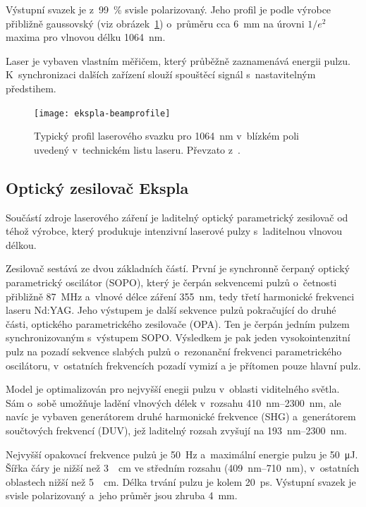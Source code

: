 Výstupní svazek je z~\SI{99}{\percent} svisle polarizovaný.
Jeho profil je podle výrobce přibližně gaussovský
(viz obrázek~\ref{fig:instruments-beamprofile})
o~průměru cca \SI{6}{\milli\metre} na úrovni $1/e^2$ maxima
pro vlnovou délku \SI{1064}{\nano\metre}.
\autocite{ekspla-datasheet}

Laser je vybaven vlastním měřičem, který průběžně zaznamenává energii pulzu.
K~synchronizaci dalších zařízení slouží spouštěcí signál s~nastavitelným
předstihem.\autocite{ekspla-datasheet}

\begin{figure}[htp]
	\centering
	\texttt{[image: ekspla-beamprofile]}
	\caption{Typický profil laserového svazku pro \SI{1064}{\nano\metre}
		v~blízkém poli uvedený v~technickém listu laseru.
		Převzato z~\cite{ekspla-datasheet}.}
	\label{fig:instruments-beamprofile}
\end{figure}

\subsection{Optický zesilovač Ekspla }
\label{sec:instruments-laser-source}
Součástí zdroje laserového záření je laditelný optický parametrický
zesilovač  od téhož výrobce,
který produkuje intenzivní laserové pulzy s~laditelnou vlnovou délkou.

Zesilovač sestává ze dvou základních částí.
První je synchronně čerpaný optický parametrický oscilátor (SOPO),
který je čerpán sekvencemi pulzů o~četnosti přibližně \SI{87}{\mega\hertz}
a~vlnové délce záření \SI{355}{\nano\metre},
tedy třetí harmonické frekvenci laseru Nd:YAG.
Jeho výstupem je další sekvence pulzů pokračující do druhé části,
optického parametrického zesilovače (OPA).
Ten je čerpán jedním pulzem synchronizovaným s~výstupem SOPO.
Výsledkem je pak jeden vysokointenzitní pulz na pozadí sekvence slabých
pulzů o~rezonanční frekvenci parametrického oscilátoru,
v~ostatních frekvencích pozadí vymizí a je přítomen pouze hlavní pulz.
\autocite{ekspla-amp-datasheet}

Model  je optimalizován pro nejvyšší enegii pulzu
v~oblasti viditelného světla.
Sám o~sobě umožňuje ladění vlnových délek v~rozsahu
\SIrange{410}{2300}{\nano\metre},
ale navíc je vybaven generátorem druhé harmonické frekvence (SHG)
a~generátorem součtových frekvencí (DUV),
jež laditelný rozsah zvyšují na \SIrange{193}{2300}{\nano\metre}.

Nejvyšší opakovací frekvence pulzů je \SI{50}{\hertz}
a~maximální energie pulzu je \SI{50}{\micro\joule}.
Šířka čáry je nižší než \SI{3}{\per\centi\metre} ve středním rozsahu
(\SIrange{409}{710}{\nano\metre}),
v~ostatních oblastech nižší než \SI{5}{\per\centi\metre}.
Délka trvání pulzu je kolem \SI{20}{\pico\second}.
Výstupní svazek je svisle polarizovaný a~jeho průměr
jsou zhruba \SI{4}{\milli\metre}.
\autocite{ekspla-amp-datasheet}

